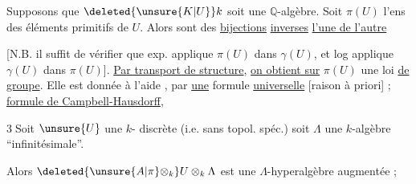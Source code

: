 Supposons  que $\deleted{\unsure{K|U}}k$ soit une $\mathbb Q$-algèbre. 
Soit $\pi(U)$ \deleted{$\exp\xi$} l'ens des éléments primitifs de $U$.
Alors
sont des \uline{bijections} \uline{inverses} \uline{l'une de l'autre}

[N.B. il suffit de vérifier que exp.
applique $\pi(U)$ dans $\gamma(U)$, et log applique
$\gamma(U)$ dans $\pi(U)$]. \uline{Par transport de structure},
\uline{on obtient sur} $\pi(U)$ une loi \uline{de groupe}. Elle est
donnée à l'aide , par \uline{une} formule
\uline{universelle} [raison  à priori] ;  \uline{formule de Campbell-Hausdorff},

\textcircled{3}\quad Soit $\unsure{U}$ une $k$- discrète
(i.e. sans topol. spéc.)  soit
$\Lambda$ une $k$-algèbre ``infinitésimale''.

Alors $\deleted{\unsure{A|\pi}\otimes_k} U\otimes_k\Lambda$ est une $\Lambda$-hyperalgèbre
augmentée ; 

